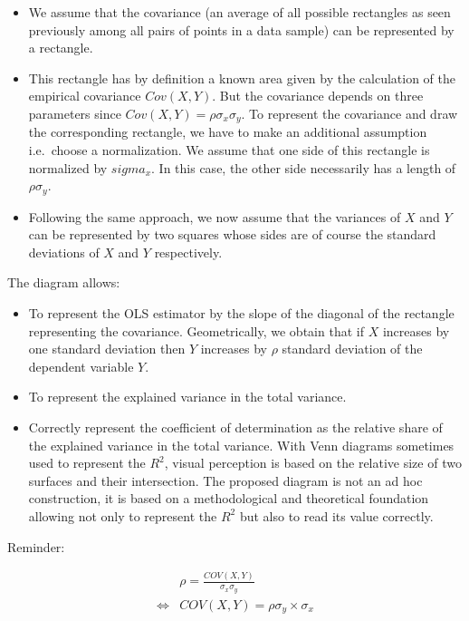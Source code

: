 \documentclass[
]{report}
\providecommand{\tightlist}{%
  \setlength{\itemsep}{0pt}\setlength{\parskip}{0pt}}
\begin{document}
\begin{itemize}
\tightlist
\item
  We assume that the covariance (an average of all possible rectangles as seen previously among all pairs of points in a data sample) can be represented by a rectangle.
\item
  This rectangle has by definition a known area given by the calculation of the empirical covariance \(Cov(X,Y)\). But the covariance depends on three parameters since \(Cov(X,Y) =\rho \sigma_x \sigma_y\). To represent the covariance and draw the corresponding rectangle, we have to make an additional assumption i.e.~choose a normalization.
  We assume that one side of this rectangle is normalized by \(sigma_x\). In this case, the other side necessarily has a length of \(\rho \sigma_y\).
\item
  Following the same approach, we now assume that the variances of \(X\) and \(Y\) can be represented by two squares whose sides are of course the standard deviations of \(X\) and \(Y\) respectively.
\end{itemize}

The diagram allows:

\begin{itemize}
\tightlist
\item
  To represent the OLS estimator by the slope of the diagonal of the rectangle representing the covariance. Geometrically, we obtain that if \(X\) increases by one standard deviation then \(Y\) increases by \(\rho\) standard deviation of the dependent variable \(Y\).
\item
  To represent the explained variance in the total variance.
\item
  Correctly represent the coefficient of determination as the relative share of the explained variance in the total variance. With Venn diagrams sometimes used to represent the \(R^2\), visual perception is based on the relative size of two surfaces and their intersection. The proposed diagram is not an ad hoc construction, it is based on a methodological and theoretical foundation allowing not only to represent the \(R^2\) but also to read its value correctly.
\end{itemize}

Reminder:

\begin{align*}
& \rho = \frac{COV(X,Y)}{\sigma_x \sigma_y}\\
\Leftrightarrow & COV(X,Y) = \rho \sigma_y \times \sigma_x
\end{align*}
\end{document}
